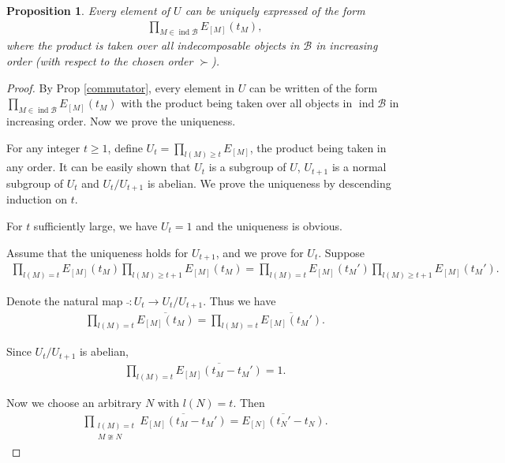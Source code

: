 \documentclass[12pt]{amsart}
\newtheorem{proposition}[theorem]{Proposition}
\begin{document}
\begin{proposition}\label{Uunique}
    Every element of $U$ can be uniquely expressed of the form 
    \begin{align*}
        \prod\limits_{M\in \operatorname{ind}\mathcal{B}} E_{[M]}(t_M),
    \end{align*}
    where the product is taken over all indecomposable objects in $\mathcal{B}$ in increasing order (with respect to the chosen order $\succ$).
\end{proposition}

\begin{proof}
    By Prop \ref{commutator}, every element in $U$ can be written of the form $ \prod\limits_{M\in \operatorname{ind}\mathcal{B}} E_{[M]}(t_M)$ with the product being taken over all objects in $\operatorname{ind}\mathcal{B}$ in increasing order.
    Now we prove the uniqueness.

    For any integer $t\geq 1$, define $U_t = \prod\limits_{l(M)\geq t} E_{[M]}$, the product being taken in any order.
    It can be easily shown that $U_t$ is a subgroup of $U$, $U_{t+1}$ is a normal subgroup of $U_t$ and $U_t/U_{t+1}$ is abelian.
    We prove the uniqueness by descending induction on $t$.

    For $t$ sufficiently large, we have $U_t = 1$ and the uniqueness is obvious.

    Assume that the uniqueness holds for $U_{t+1}$, and we prove for $U_t$. Suppose
    \begin{align*}
        \prod\limits_{l(M)=t} E_{[M]}(t_M)   \prod\limits_{l(M)\geq t+1} E_{[M]}(t_M) =  \prod\limits_{l(M)=t} E_{[M]}(t_M')    \prod\limits_{l(M)\geq t+1} E_{[M]}(t_M').
    \end{align*}

    Denote the natural map $\bar{ } : U_t \rightarrow U_t/U_{t+1}$. Thus we have
    \begin{align*}
        \prod\limits_{l(M)=t} \overline{E_{[M]}(t_M)} =  \prod\limits_{l(M)=t} \overline{E_{[M]}(t_M')}.
    \end{align*} 

    Since $U_t/U_{t+1}$ is abelian, 
    \begin{align*}
        \prod\limits_{l(M)=t} \overline{E_{[M]}(t_M - t_M')} = 1.
    \end{align*}

    Now we choose an arbitrary $N$ with $l(N) = t$. Then  
    \begin{align*}
        \prod_{\substack{l(M) = t \\ M\ncong N}} \overline{E_{[M]}(t_M - t_M')} =   \overline{E_{[N]}(t_N' - t_N) }.
    \end{align*}
    

\end{proof}
\end{document}
